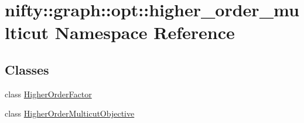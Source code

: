 \hypertarget{namespacenifty_1_1graph_1_1opt_1_1higher__order__multicut}{}\section{nifty\+:\+:graph\+:\+:opt\+:\+:higher\+\_\+order\+\_\+multicut Namespace Reference}
\label{namespacenifty_1_1graph_1_1opt_1_1higher__order__multicut}
\subsection*{Classes}
\begin{DoxyCompactItemize}
\item 
class \hyperlink{classnifty_1_1graph_1_1opt_1_1higher__order__multicut_1_1HigherOrderFactor}{Higher\+Order\+Factor}
\item 
class \hyperlink{classnifty_1_1graph_1_1opt_1_1higher__order__multicut_1_1HigherOrderMulticutObjective}{Higher\+Order\+Multicut\+Objective}
\end{DoxyCompactItemize}
